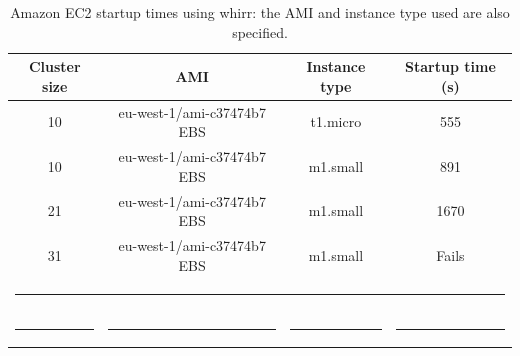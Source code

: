 \documentclass[oribibl]{llncs_Ibergrid2013}
\begin{document}
\begin{table}[h!]
\caption{Amazon EC2 startup times using whirr: the AMI and instance type used are also specified.}
\label{table:whirr}
%
\vspace{-0.5em}
%
\begin{center}
\begin{tabular}{cccc}
\toprule
Cluster size				& AMI				& Instance type		& Startup time (s) 	  \\
\midrule
10                   			& eu-west-1/ami-c37474b7 EBS	& t1.micro 		& 555   		  \\
10                   			& eu-west-1/ami-c37474b7 EBS	& m1.small		& 891			  \\
21                   			& eu-west-1/ami-c37474b7 EBS	& m1.small 		& 1670			  \\
31                   			& eu-west-1/ami-c37474b7 EBS	& m1.small 		& Fails  		  \\
%
\bottomrule
\multicolumn{4}{c}{\rule{0.98\textwidth}{0em}}\\
\rule{0.2\textwidth}{0cm} & \rule{0.2\textwidth}{0cm} & \rule{0.2\textwidth}{0cm} &  \rule{0.2\textwidth}{0cm} & \\
\end{tabular}
\end{center}
\end{table}
\end{document}
